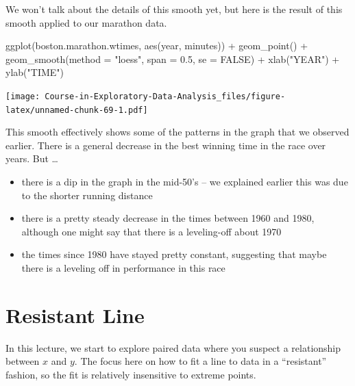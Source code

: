 \documentclass[
]{book}
\newenvironment{Shaded}{\begin{snugshade}}{\end{snugshade}}
\newcommand{\AttributeTok}[1]{\textcolor[rgb]{0.77,0.63,0.00}{#1}}
\newcommand{\ConstantTok}[1]{\textcolor[rgb]{0.00,0.00,0.00}{#1}}
\newcommand{\FloatTok}[1]{\textcolor[rgb]{0.00,0.00,0.81}{#1}}
\newcommand{\FunctionTok}[1]{\textcolor[rgb]{0.00,0.00,0.00}{#1}}
\newcommand{\NormalTok}[1]{#1}
\newcommand{\SpecialCharTok}[1]{\textcolor[rgb]{0.00,0.00,0.00}{#1}}
\newcommand{\StringTok}[1]{\textcolor[rgb]{0.31,0.60,0.02}{#1}}
\providecommand{\tightlist}{%
  \setlength{\itemsep}{0pt}\setlength{\parskip}{0pt}}
\begin{document}
We won't talk about the details of this smooth yet, but here is the result of this smooth applied to our marathon data.

\begin{Shaded}
\begin{Highlighting}[]
\FunctionTok{ggplot}\NormalTok{(boston.marathon.wtimes,}
       \FunctionTok{aes}\NormalTok{(year, minutes)) }\SpecialCharTok{+}
  \FunctionTok{geom\_point}\NormalTok{() }\SpecialCharTok{+}
  \FunctionTok{geom\_smooth}\NormalTok{(}\AttributeTok{method =} \StringTok{"loess"}\NormalTok{, }\AttributeTok{span =} \FloatTok{0.5}\NormalTok{, }
              \AttributeTok{se =} \ConstantTok{FALSE}\NormalTok{) }\SpecialCharTok{+}
  \FunctionTok{xlab}\NormalTok{(}\StringTok{"YEAR"}\NormalTok{) }\SpecialCharTok{+} \FunctionTok{ylab}\NormalTok{(}\StringTok{"TIME"}\NormalTok{)          }
\end{Highlighting}
\end{Shaded}

\texttt{[image: Course-in-Exploratory-Data-Analysis\_files/figure-latex/unnamed-chunk-69-1.pdf]}

This smooth effectively shows some of the patterns in the graph that we observed earlier. There is a general decrease in the best winning time in the race over years. But \ldots{}

\begin{itemize}
\tightlist
\item
  there is a dip in the graph in the mid-50's -- we explained earlier this was due to the shorter running distance
\item
  there is a pretty steady decrease in the times between 1960 and 1980, although one might say that there is a leveling-off about 1970
\item
  the times since 1980 have stayed pretty constant, suggesting that maybe there is a leveling off in performance in this race
\end{itemize}

\hypertarget{resistant-line}{%
\chapter{Resistant Line}\label{resistant-line}}

In this lecture, we start to explore paired data where you suspect a relationship between \(x\) and \(y\). The focus here on how to fit a line to data in a ``resistant'' fashion, so the fit is relatively insensitive to extreme points.
\end{document}
